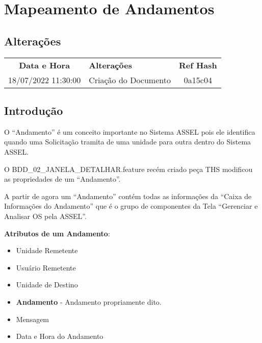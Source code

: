 \chapter{Mapeamento de Andamentos}
\label{detalhes:mapeamento-andamentos}

\section*{Alterações}


\begin{center}
	\begin{tabular}{|c|p{}|c|}
		\hline
		\rowcolor{lightgray!50} \multicolumn{3}{|c|}{\Large Alterações Mapeamento de Andamentos \normalsize} \\ \hline \hline
		\rowcolor{lightgray}\textbf{Data e Hora} & \textbf{Alterações} & \textbf{Ref Hash}  \\ \hline
		\rowcolor{corCOULD!10} 18/07/2022 11:30:00 & Criação do Documento & 0a15c04 \\ \hline			
	\end{tabular}    
\end{center}

\section{Introdução}

O ``Andamento'' é um conceito importante no Sistema ASSEL pois ele identifica quando uma Solicitação tramita de uma unidade para outra dentro do Sistema ASSEL.

O BDD\_02\_JANELA\_DETALHAR.feature recém criado peça THS modificou as propriedades de um ``Andamento''.

A partir de agora um ``Andamento'' contém todas as informações da ``Caixa de Informações do Andamento'' que é o grupo de componentes da Tela ``Gerenciar e Analisar OS pela ASSEL''.

\textbf{Atributos de um Andamento}:

\begin{itemize}
	\item Unidade Remetente
	\item Usuário Remetente
	\item Unidade de Destino
	\item \textbf{Andamento} - Andamento propriamente dito.
	\item Mensagem
	\item Data e Hora do Andamento
\end{itemize}

